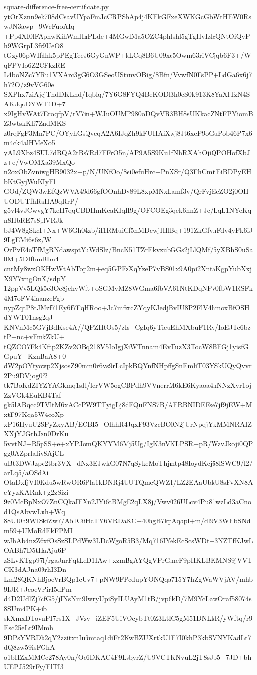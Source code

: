 \documentclass[11pt]{article}
\theoremstyle{definition}
\theoremstyle{remark}
\begin{document}
\begin{filecontents*}[overwrite]{square-difference-free-certificate.py}
ytOrXznn9ek708dCsavUYpaFmJcCRPSbAp4j4KFkGFxeXWKGcGbWtHEW0RswJN3awp+9WcFuoAIq
+Pp4XI0lFApnwKihWmHnPLde+4MGwlMa5OZC4phIshl5gTgHvIzleQNtOiQvPh9WGrpL3fr9UeO8
tGzy06pWIfdhk5pPEgTeeJ6GyGnWP+kLCq8B6U09xe5Owm63riVCjqb6F3+/WqFPVIo6Z2CFkzRE
L4boNZc7YRu1VXArc3gG6O3GSeoUStrnvOBig/8Bfn/VvwfN0FsPP+LdGa6x6j7h72O/z9vVG60e
SXPhx7ziAjcjThdDKLnd/1qblq/7Y6G8FYQ4BeKODl3h0cS0k913K8YaXlTzN4SAKdqoDYWT4D+7
x9IgHvWAt7EroqfpV/rV7in+WJuOUMP980oDQvVR3BH8sUKkacZNtFPYiomBZ3wtskKli7ZndMKS
z0rqFgF3Mn7PC/OYyhGsQvcqA2A6IJqZh9kFUHAiXwj8Jt6xeP9oGuPob46P7x6m4ck4alHMeXo5
yAL9Xbz4SUL7dRQA2tBs7Rd7FFrO5n/AP9A5S9Ku1fNhRXAhOjiQPOHofXbJz+e/VwOMXa39MxQo
n2oxObZvniwgHB9032x+p/N/UNfOo/8ei0efuHrc+PnXSr/Q3FhCmiiEiBDPyEHbKtGyjWuKIyFl
GOd/ZQW3wEfQzWVA49d66gfOOnhDv89L8xpMNxLamf3v/QrFvjEcZO2j0OHUODUTfhRaHA9qRrP/
g5vl4vJCwvgY7keH7qqCBDHmKcaKIqH9g/OFCOEg3qek6nnZ+Jc/LqL1NYeKqn8HbRE7s8plVRJk
bJ4W8gSkcI+Nx+W6Gh04zb/iI1RMuiCf5hMDcwjHIlBq+191ZkGfvnFdv4yFk6iJ9LgEMi6s6z/W
OrPvE4oTfMgRNdawsptYuWdSlz/BncK51TZrEkvzubGGs2jLlQMf/5yXBhS0uSa0M+5DIfbmBIm4
cnrMy8wzOKHwWtAbTop2m+eq5GPFzXqYzeP7vBS01x9A0pi2XntaKgpYubXxjX9Y7xngOnX/sdpY
12ppVv5LQk5c3Oe8jehvWft+oSGMvMZ8WGma6fbVA61NtKDqNPv0fbW1RSFk4M7oFV4iaanzeFgb
nypZqtP8tJMzf71Ey6f7FqHRoo+Jc7mfzrcZYqyKJedjBvIU8P2FlV4hmoxBfOSHdYWT01nsg2qJ
KNVnMc5GVjBdKse4A//QPZHtOs5/zIs+CgIq6yTieuEhMXbuF1Rv/IoEJTc6bztP+nc+vFmkZkU+
tQZCO7Fk4Kftp2KZv2OBq218V5IoIgjXiWTnnam4EvTuzX3TocW8BFGj1yisfGGpuY+KznBaA8+0
dW2pOYtyowp2XjsosZ90mm0r6vs9rLcIpkBQYnfNHpffgSnEmliT03YSkUQyQvvr2Pu9DVjog0f2
tk7BoKdZIYZYAGkmq1sH/lcrVW5ogCBPdh9VVnerrM6kE6Kyaoa4hNNzXvr1ojZzVGk4EuKB4Taf
gk5lABqcc9TVltM6xACcPW9TTyigLj8dFQuFNS7B/AFRBNIDEFse7jf9jEW+MxtF97Kqa5W4eoXp
xP16HyuU2SPyZxyAB/ECBI5+OlhhR4JqxF93VzcBO0N2jUrNpqjYkMMNRAIZXXjYJGrhJzn0DrKu
5vvtNJ+R5pSS+e+xYPJomQKYYM6Mj5Ug/IgK3nVKLPSR+pR/WzvJkoji0QPgg0AZprlaIiv8AjCL
uBt3DWJzpc2tbr3VX+dNx3EJwkG07N7qSykeMoThjmtp48IoydKcj68lSWC9/l2/arLq5/aOSdAi
OtaDxfjVI0Kdu5wRwOR6Pla1kDNRj4UUTQmeQWZ1/LZ2EAaUbkU8sFvXN8AeYyzKARnk+g2zSizi
9z0McBpNxO7ZnCQkaIFXn2JYi6tBMgE2qLX8j/Vwv026ULcv4Pu81wzLd3aCnod1QsAbvwLuh+Wq
88UI0h9WISkiZw7/A51CiiHcTY6VRDaKC+405gB7kpAq5pl+m/dl9V3WFbSNdm59+UMoRdEkFPMI
wJhAb4nzZ6xfOsSzSLPdWw3LDcWgoR6B3/Mq716IYekEcScsWDt+3NZTfKJwLOABh7D5tHaAju6P
zSLvKTgp97l/rgaJnrFqtLeD1IAw+xzmBgAYQgVPrGmeF9pHKLBKMNS9jVVTCK3dAJna09rhI3Dn
Lm28QKNhBjoeVrBQp1cUv7+pNW9FPcdupYONQqa715Y7hZgWaWVjAV/mhb9IJR+JcoeVPirI5dPm
d4D2UdlZj7cfG5/jINsNm9IwryUpiSyILUAyM1tB/jvp6kD/7M9YcLawOraf58074s8SUm4PK+ib
skXmxDTovnPI7rs1X+JVzv+iZEF5UiVOcybTt0Z3LtIC5gM51DNLkR/yWftq/r9Esc25eLr9IMmh
9DPsYVRDb2qY2zzitxnIu6mtaq1diFt2KwBZUXrtkU1F7I0khP3kbSVNYKadLt7dQ8zw59isFGhA
o1bHZxMMCc278Ay0n/Oe6DKAC4F9LsbyrZ/U9VCTKNvuL2jT8sJb5+7JD+bhUEPJ529rFy/FlTI3

\end{filecontents*}
\end{document}

